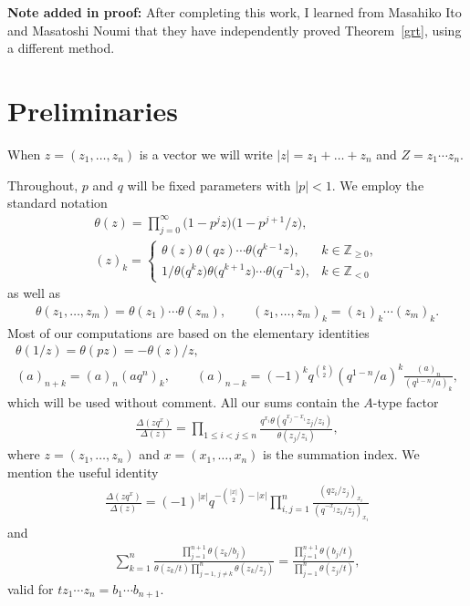 \documentclass[pdftex]{sigma}
\numberwithin{equation}{section}
\begin{document}
{\bf Note added in proof:} After completing this work, I learned from Masahiko Ito and Masatoshi Noumi that they have independently proved Theorem~\ref{grt}, using a dif\/ferent method.

\section{Preliminaries}

When $z=(z_1,\dots,z_n)$ is a vector we will write $|z|=z_1+\dots+z_n$ and $Z=z_1\dotsm z_n$.

Throughout, $p$ and $q$ will be f\/ixed parameters with $|p|<1$. We employ the standard notation
\begin{gather*}\theta(z)=\prod\limits_{j=0}^\infty\big(1-p^jz\big)\big(1-p^{j+1}/z\big), \\
(z)_k=\begin{cases}\theta(z)\theta(qz)\dotsm\theta\big(q^{k-1}z\big), & k\in\mathbb Z_{\geq 0},\\
1/\theta\big(q^kz\big)\theta\big(q^{k+1}z\big)\dotsm\theta\big(q^{-1}z\big), & k\in\mathbb Z_{<0}\end{cases} \end{gather*}
as well as
\begin{gather*}\theta(z_1,\dots,z_m)=\theta(z_1)\dotsm\theta(z_m), \qquad (z_1,\dots,z_m)_k=(z_1)_k\dotsm(z_m)_k.\end{gather*}
Most of our computations are based on the elementary identities
\begin{gather*}\theta(1/z)=\theta(pz)=-\theta(z)/z, \\
(a)_{n+k}=(a)_n(aq^n)_k,\qquad (a)_{n-k}=(-1)^kq^{\binom k2}(q^{1-n}/a)^k\frac{(a)_n}{(q^{1-n}/a)_k}, \end{gather*}
which will be used without comment. All our sums contain the $A$-type factor
\begin{gather*}\frac{\Delta(zq^x)}{\Delta(z)}=\prod\limits_{1\leq i<j\leq n}\frac{q^{x_i}\theta(q^{x_j-x_i}z_j/z_i)}{\theta(z_j/z_i)}, \end{gather*}
where $z=(z_1,\dots,z_n)$ and $x=(x_1,\dots,x_n)$ is the summation index. We mention the useful identity \cite[equation~(3.8)]{r}
\begin{gather}\label{etf}
\frac{\Delta(z q^x)}{\Delta(z)}=(-1)^{|x|}q^{-\binom{|x|}2-|x|}\prod\limits_{i,j=1}^n\frac{(qz_i/z_j)_{x_i}}{(q^{-x_j}z_i/z_j)_{x_i}}
\end{gather}
and \cite[Example~20.53.3]{ww}
\begin{gather}\label{tpf}
\sum_{k=1}^n\frac{\prod\limits_{j=1}^{n+1}\theta(z_k/b_j)}{\theta(z_k/t)\prod\limits_{j=1,\, j\neq k}^n\theta(z_k/z_j)}=\frac{\prod\limits_{j=1}^{n+1}\theta(b_j/t)}{\prod\limits_{j=1}^n\theta(z_j/t)},
\end{gather}
valid for $tz_1\dotsm z_n=b_1\dotsm b_{n+1}$.
\end{document}
